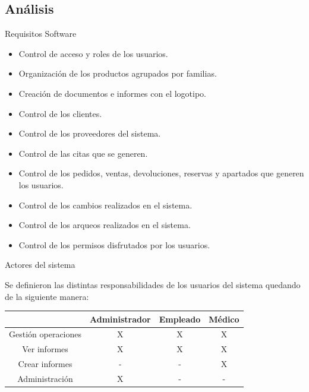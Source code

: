 \documentclass[spanish,xcolor=table,svgnames]{beamer}
\begin{document}
\subsection*{Análisis}
\begin{frame}{Requisitos Software}
  \begin{block}{}
\begin{itemize}
\item Control de acceso y roles de los usuarios.\pause
\item Organización de los productos agrupados por familias.\pause
\item Creación de documentos e informes con el logotipo.\pause
\item Control de los clientes.\pause
\item Control de los proveedores del sistema.\pause
\item Control de las citas que se generen.\pause
\item Control de los pedidos, ventas, devoluciones, reservas y apartados que generen los usuarios.\pause
\item Control de los cambios realizados en el sistema.\pause
\item Control de los arqueos realizados en el sistema.\pause
\item Control de los permisos disfrutados por los usuarios.
\end{itemize}
  \end{block}
\end{frame}

\begin{frame}{Actores del sistema}

Se definieron las distintas responsabilidades de los usuarios del sistema quedando de la siguiente manera:\\
\begin{table}[ht]
\begin{tabular}{c c c c} %
\hline\hline                        %
 & Administrador & Empleado & Médico\\ [0.5ex] %
\hline                  %
Gestión operaciones & X & X & X  \\ %
Ver informes & X & X & X \\
Crear informes & - & - & X  \\
Administración & X & - & -  \\   [1ex]      %
\hline
\end{tabular}
\end{table}
\end{frame}
\end{document}
